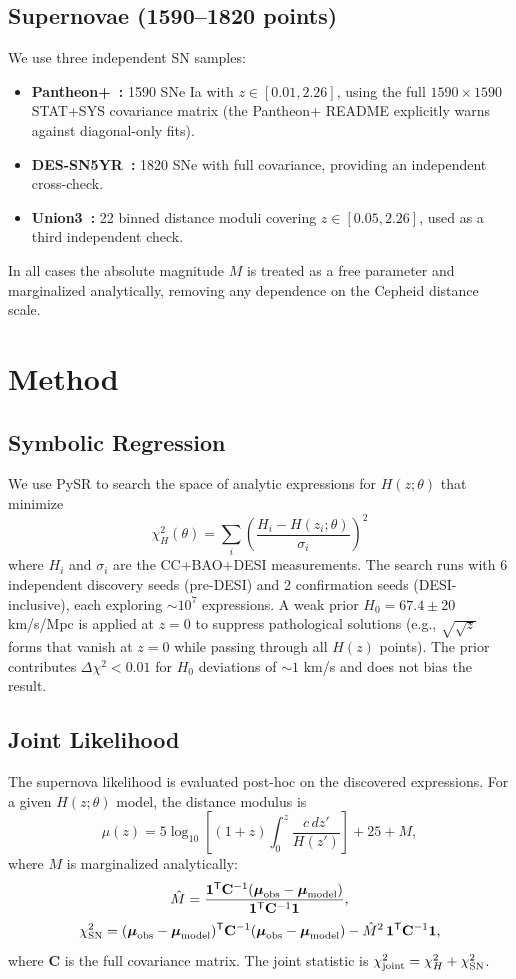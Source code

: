 \documentclass[twocolumn]{aastex631}
\begin{document}
\subsection{Supernovae (1590--1820 points)}
We use three independent SN samples:
\begin{itemize}
\item \textbf{Pantheon+~\cite{pantheon_plus}:} 1590 SNe Ia with $z\in[0.01,2.26]$, using the full $1590\times1590$ STAT+SYS covariance matrix (the Pantheon+ README explicitly warns against diagonal-only fits).
\item \textbf{DES-SN5YR~\cite{des_sn5yr}:} 1820 SNe with full covariance, providing an independent cross-check.
\item \textbf{Union3~\cite{union3}:} 22 binned distance moduli covering $z\in[0.05,2.26]$, used as a third independent check.
\end{itemize}
In all cases the absolute magnitude $M$ is treated as a free parameter and
marginalized analytically, removing any dependence on the Cepheid distance
scale.

\section{Method}

\subsection{Symbolic Regression}
We use PySR \cite{pysr} to search the space of analytic expressions for
$H(z;\theta)$ that minimize
\[
\chi^2_H(\theta) = \sum_i \left(\frac{H_i - H(z_i;\theta)}{\sigma_i}\right)^2
\]
where $H_i$ and $\sigma_i$ are the CC+BAO+DESI measurements.  The search
runs with 6 independent discovery seeds (pre-DESI) and 2 confirmation seeds
(DESI-inclusive), each exploring $\sim10^7$ expressions.
A weak prior $H_0 = 67.4 \pm 20$ km/s/Mpc is applied at $z=0$ to suppress
pathological solutions (e.g., $\sqrt{\sqrt{z}}$ forms that vanish at $z=0$
while passing through all $H(z)$ points).  The prior contributes
$\Delta\chi^2 < 0.01$ for $H_0$ deviations of $\sim1$ km/s and does not bias the result.

\subsection{Joint Likelihood}
The supernova likelihood is evaluated post-hoc on the discovered
expressions.  For a given $H(z;\theta)$ model, the distance modulus is
\[
\mu(z) = 5\log_{10}\!\left[(1+z) \int_0^z \frac{c\,dz'}{H(z')}\right] + 25 + M,
\]
where $M$ is marginalized analytically:
\[
\hat{M} = \frac{\mathbf{1}^\mathsf{T} \mathbf{C}^{-1} (\boldsymbol{\mu}_{\rm obs} - \boldsymbol{\mu}_{\rm model})}
                 {\mathbf{1}^\mathsf{T} \mathbf{C}^{-1} \mathbf{1}},
\]
\[
\chi^2_{\rm SN} = (\boldsymbol{\mu}_{\rm obs} - \boldsymbol{\mu}_{\rm model})^\mathsf{T}
\mathbf{C}^{-1} (\boldsymbol{\mu}_{\rm obs} - \boldsymbol{\mu}_{\rm model})
- \hat{M}^2\, \mathbf{1}^\mathsf{T} \mathbf{C}^{-1} \mathbf{1},
\]
where $\mathbf{C}$ is the full covariance matrix.  The joint statistic is
$\chi^2_{\rm joint} = \chi^2_H + \chi^2_{\rm SN}$.
\end{document}
